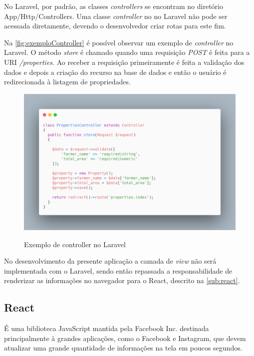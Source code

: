 No Laravel, por padrão, as classes \textit{controllers} se encontram no diretório App/Http/Controllers. Uma classe \textit{controller} no no Laravel não pode ser acessada diretamente, devendo o desenvolvedor criar rotas para este fim.

Na \autoref{fig:exemploController} é possível observar um exemplo de \textit{controller} no Laravel. O método \emph{store} é chamado quando uma requisição \emph{POST} é feita para a URI \emph{/properties}. Ao receber a requisição primeiramente é feita a validação dos dados e depois a criação do recurso na base de dados e então o usuário é redirecionada à listagem de propriedades.

\begin{figure}[H]
    \centering
    \caption{Exemplo de controller no Laravel}
    \includegraphics[width=13cm]{dados/figuras/exemplo_Controller_Laravel.png}
    \label{fig:exemploController}
\end{figure}

No desenvolvimento da presente aplicação a camada de \textit{view} não será implementada com o Laravel, sendo então repassada a responsabilidade de renderizar as informações no navegador para o React, descrito na \autoref{sub:react}.

\subsection{React}
\label{sub:react}

É uma biblioteca JavaScript mantida pela Facebook Inc. destinada principalmente à grandes aplicações, como o Facebook e Instagram, que devem atualizar uma grande quantidade de informações na tela em poucos segundos.


